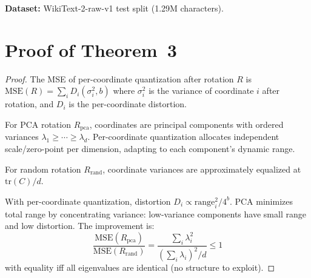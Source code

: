 \documentclass[10pt,twocolumn]{article}
\begin{document}
\textbf{Dataset:} WikiText-2-raw-v1 \citep{merity2017pointer} test split (1.29M characters).

\section{Proof of Theorem~3}

\begin{proof}
The MSE of per-coordinate quantization after rotation $R$ is $\text{MSE}(R) = \sum_i D_i(\sigma_i^2, b)$ where $\sigma_i^2$ is the variance of coordinate $i$ after rotation, and $D_i$ is the per-coordinate distortion.

For PCA rotation $R_{\text{pca}}$, coordinates are principal components with ordered variances $\lambda_1 \geq \cdots \geq \lambda_d$. Per-coordinate quantization allocates independent scale/zero-point per dimension, adapting to each component's dynamic range.

For random rotation $R_{\text{rand}}$, coordinate variances are approximately equalized at $\text{tr}(C)/d$.

With per-coordinate quantization, distortion $D_i \propto \text{range}_i^2 / 4^b$. PCA minimizes total range by concentrating variance: low-variance components have small range and low distortion. The improvement is:
\begin{equation}
\frac{\text{MSE}(R_{\text{pca}})}{\text{MSE}(R_{\text{rand}})} = \frac{\sum_i \lambda_i^2}{\left(\sum_i \lambda_i\right)^2 / d} \leq 1
\end{equation}
with equality iff all eigenvalues are identical (no structure to exploit).
\end{proof}

\balance


\end{document}
